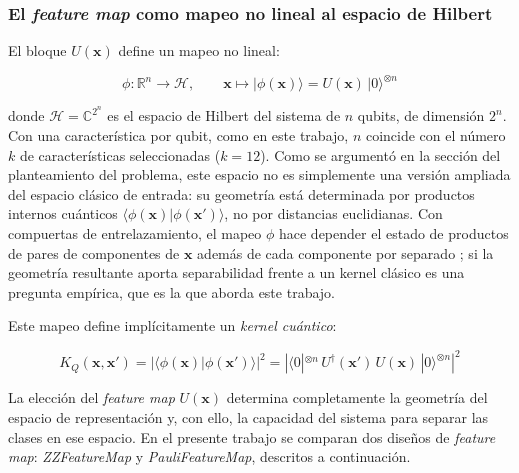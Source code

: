 
\subsubsection{El \textit{feature map} como mapeo no lineal al espacio de Hilbert}
\label{sec:feature_map}

El bloque $U(\mathbf{x})$ define un mapeo no lineal:

\begin{equation}
  \phi: \mathbb{R}^n \rightarrow \mathcal{H}, \qquad
  \mathbf{x} \mapsto |\phi(\mathbf{x})\rangle =
  U(\mathbf{x})\,|0\rangle^{\otimes n}
  \label{eq:feature_map}
\end{equation}

\noindent donde $\mathcal{H} = \mathbb{C}^{2^n}$ es el
espacio de Hilbert del sistema de $n$ qubits, de dimensión
$2^n$. Con una característica por qubit, como en este trabajo, $n$ coincide con el número $k$ de
características seleccionadas ($k = 12$). Como se argumentó en la sección del planteamiento
del problema, este espacio no es simplemente una versión
ampliada del espacio clásico de entrada: su geometría está
determinada por productos internos cuánticos
$\langle\phi(\mathbf{x})|\phi(\mathbf{x}')\rangle$, no por
distancias euclidianas. Con compuertas de entrelazamiento,
el mapeo $\phi$ hace depender el estado de productos de pares
de componentes de $\mathbf{x}$ además de cada componente por
separado \cite{Schuld2019QuantumML, havlicek2019supervised}; si
la geometría resultante aporta separabilidad frente a un kernel
clásico es una pregunta empírica, que es la que aborda este trabajo.

Este mapeo define implícitamente un \textit{kernel cuántico}:

\begin{equation}
  K_Q(\mathbf{x}, \mathbf{x}') =
  \left|\langle\phi(\mathbf{x})|\phi(\mathbf{x}')\rangle
  \right|^2 =
  \left|\langle 0|^{\otimes n}\,U^\dagger(\mathbf{x}')\,
  U(\mathbf{x})\,|0\rangle^{\otimes n}\right|^2
  \label{eq:quantum_kernel}
\end{equation}

\noindent La elección del \textit{feature map} $U(\mathbf{x})$
determina completamente la geometría del espacio de
representación y, con ello, la capacidad del sistema para
separar las clases en ese espacio. En el presente trabajo
se comparan dos diseños de \textit{feature map}:
\textit{ZZFeatureMap} y \textit{PauliFeatureMap},
descritos a continuación.
